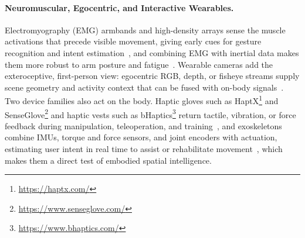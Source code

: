 \paragraph{Neuromuscular, Egocentric, and Interactive Wearables.}
Electromyography (EMG) armbands and high-density arrays sense the muscle activations that precede visible movement, giving early cues for gesture recognition and intent estimation~\cite{atzori2014ninapro}, and combining EMG with inertial data makes them more robust to arm posture and fatigue~\cite{atzori2016deep}. Wearable cameras add the exteroceptive, first-person view: egocentric RGB, depth, or fisheye streams supply scene geometry and activity context that can be fused with on-body signals~\cite{grauman2022ego4d, adt}. Two device families also act on the body. Haptic gloves such as HaptX\footnote{\url{https://haptx.com/}} and SenseGlove\footnote{\url{https://www.senseglove.com/}} and haptic vests such as bHaptics\footnote{\url{https://www.bhaptics.com/}} return tactile, vibration, or force feedback during manipulation, teleoperation, and training~\cite{pacchierotti2017wearable}, and exoskeletons combine IMUs, torque and force sensors, and joint encoders with actuation, estimating user intent in real time to assist or rehabilitate movement~\cite{young2017state}, which makes them a direct test of embodied spatial intelligence.

